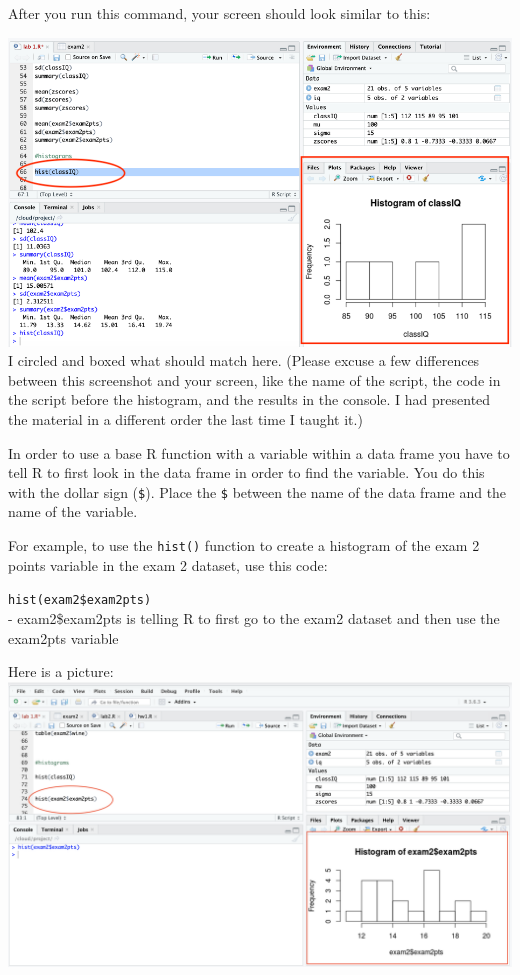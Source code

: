 \documentclass[
]{book}
\begin{document}
After you run this command, your screen should look similar to this:

\includegraphics{img/basehist.png}
I circled and boxed what should match here. (Please excuse a few differences between this screenshot and your screen, like the name of the script, the code in the script before the histogram, and the results in the console. I had presented the material in a different order the last time I taught it.)

In order to use a base R function with a variable within a data frame you have to tell R to first look in the data frame in order to find the variable. You do this with the dollar sign (\texttt{\$}). Place the \texttt{\$} between the name of the data frame and the name of the variable.

For example, to use the \texttt{hist()} function to create a histogram of the exam 2 points variable in the exam 2 dataset, use this code:

\texttt{hist(exam2\$exam2pts)}\\
- exam2\$exam2pts is telling R to first go to the exam2 dataset and then use the exam2pts variable

Here is a picture:\\
\includegraphics{img/basehist2.png}
\end{document}
